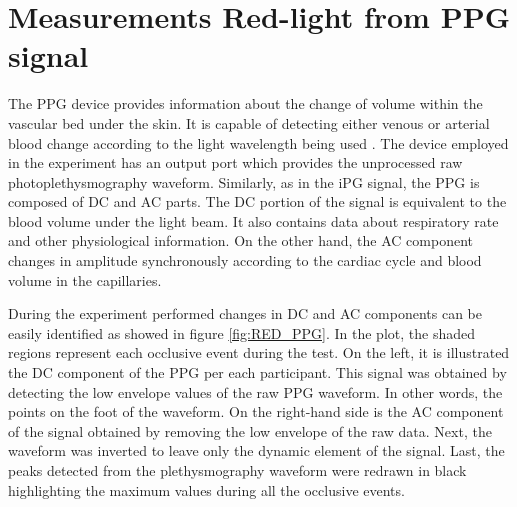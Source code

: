\section{Measurements Red-light from PPG signal}
\label{section results 8}
The PPG device provides information about the change of volume within the vascular bed under the skin. It is capable of detecting either venous or arterial blood change according to the light wavelength being used . The device employed in the experiment has an output port which provides the unprocessed raw photoplethysmography waveform. Similarly, as in the iPG signal, the PPG is composed of DC and AC parts. The DC portion of the signal is equivalent to the blood volume under the light beam. It also contains data about respiratory rate and other physiological information. On the other hand, the AC component changes in amplitude synchronously according to the cardiac cycle and blood volume in the capillaries. 

During the experiment performed changes in DC and AC components can be easily identified as showed in figure \ref{fig:RED_PPG}. In the plot, the shaded regions represent each occlusive event during the test. On the left, it is illustrated the DC component of the PPG per each participant. This signal was obtained by detecting the low envelope values of the raw PPG waveform. In other words, the points on the foot of the waveform.  On the right-hand side is the AC component of the signal obtained by removing the low envelope of the raw data. Next, the waveform was inverted to leave only the dynamic element of the signal. Last, the peaks detected from the plethysmography waveform were redrawn in black highlighting the maximum values during all the occlusive events.  

